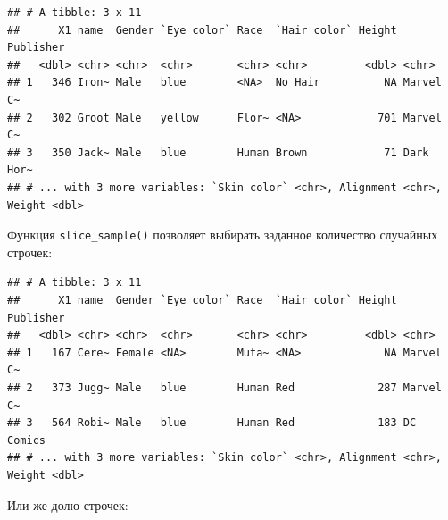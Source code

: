 \documentclass[]{book}
\newenvironment{Shaded}{\begin{snugshade}}{\end{snugshade}}
\newcommand{\KeywordTok}[1]{\textcolor[rgb]{0.13,0.29,0.53}{\textbf{#1}}}
\newcommand{\DataTypeTok}[1]{\textcolor[rgb]{0.13,0.29,0.53}{#1}}
\newcommand{\DecValTok}[1]{\textcolor[rgb]{0.00,0.00,0.81}{#1}}
\newcommand{\StringTok}[1]{\textcolor[rgb]{0.31,0.60,0.02}{#1}}
\newcommand{\OperatorTok}[1]{\textcolor[rgb]{0.81,0.36,0.00}{\textbf{#1}}}
\newcommand{\NormalTok}[1]{#1}
\begin{document}
\begin{Shaded}
\end{Shaded}

\begin{verbatim}
## # A tibble: 3 x 11
##      X1 name  Gender `Eye color` Race  `Hair color` Height Publisher
##   <dbl> <chr> <chr>  <chr>       <chr> <chr>         <dbl> <chr>    
## 1   346 Iron~ Male   blue        <NA>  No Hair          NA Marvel C~
## 2   302 Groot Male   yellow      Flor~ <NA>            701 Marvel C~
## 3   350 Jack~ Male   blue        Human Brown            71 Dark Hor~
## # ... with 3 more variables: `Skin color` <chr>, Alignment <chr>, Weight <dbl>
\end{verbatim}

Функция \texttt{slice\_sample()} позволяет выбирать заданное количество
случайных строчек:

\begin{Shaded}
\end{Shaded}

\begin{verbatim}
## # A tibble: 3 x 11
##      X1 name  Gender `Eye color` Race  `Hair color` Height Publisher
##   <dbl> <chr> <chr>  <chr>       <chr> <chr>         <dbl> <chr>    
## 1   167 Cere~ Female <NA>        Muta~ <NA>             NA Marvel C~
## 2   373 Jugg~ Male   blue        Human Red             287 Marvel C~
## 3   564 Robi~ Male   blue        Human Red             183 DC Comics
## # ... with 3 more variables: `Skin color` <chr>, Alignment <chr>, Weight <dbl>
\end{verbatim}

Или же долю строчек:

\begin{Shaded}
\end{Shaded}
\end{document}

